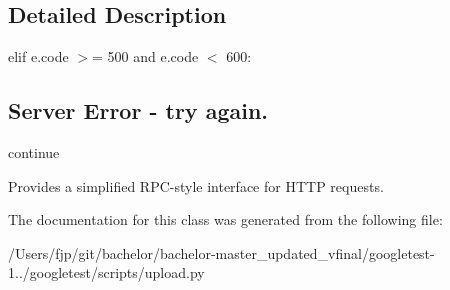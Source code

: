 \subsection{Detailed Description}
elif e.\+code $>$= 500 and e.\+code $<$ 600\+: \subsection*{Server Error -\/ try again.}

continue \begin{DoxyVerb}Provides a simplified RPC-style interface for HTTP requests.\end{DoxyVerb}
 

The documentation for this class was generated from the following file\+:\begin{DoxyCompactItemize}
\item 
/\+Users/fjp/git/bachelor/bachelor-\/master\+\_\+updated\+\_\+vfinal/googletest-\/1../googletest/scripts/upload.\+py\end{DoxyCompactItemize}
